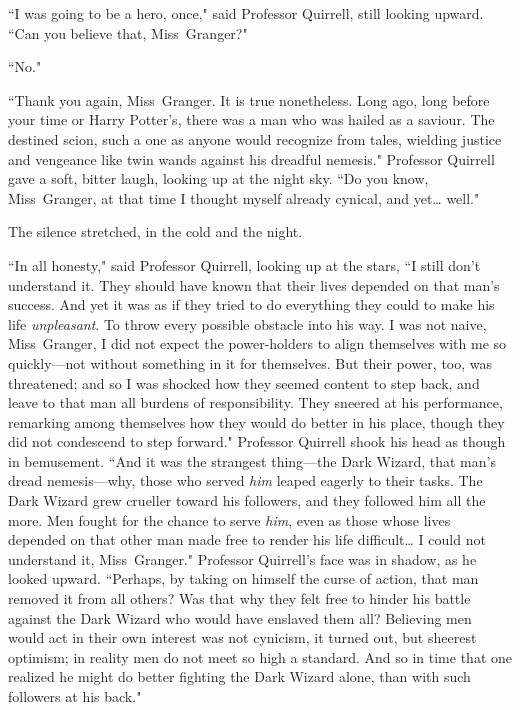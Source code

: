 ``I was going to be a hero, once," said Professor Quirrell, still looking upward. ``Can you believe that, Miss~Granger?"

``No."

``Thank you again, Miss~Granger. It is true nonetheless. Long ago, long before your time or Harry Potter's, there was a man who was hailed as a saviour. The destined scion, such a one as anyone would recognize from tales, wielding justice and vengeance like twin wands against his dreadful nemesis." Professor Quirrell gave a soft, bitter laugh, looking up at the night sky. ``Do you know, Miss~Granger, at that time I thought myself already cynical, and yet{\ldots} well."

The silence stretched, in the cold and the night.

``In all honesty," said Professor Quirrell, looking up at the stars, ``I still don't understand it. They should have known that their lives depended on that man's success. And yet it was as if they tried to do everything they could to make his life \emph{unpleasant}. To throw every possible obstacle into his way. I was not naive, Miss~Granger, I did not expect the power-holders to align themselves with me so quickly—not without something in it for themselves. But their power, too, was threatened; and so I was shocked how they seemed content to step back, and leave to that man all burdens of responsibility. They sneered at his performance, remarking among themselves how they would do better in his place, though they did not condescend to step forward." Professor Quirrell shook his head as though in bemusement. ``And it was the strangest thing—the Dark Wizard, that man's dread nemesis—why, those who served \emph{him} leaped eagerly to their tasks. The Dark Wizard grew crueller toward his followers, and they followed him all the more. Men fought for the chance to serve \emph{him}, even as those whose lives depended on that other man made free to render his life difficult{\ldots} I could not understand it, Miss~Granger." Professor Quirrell's face was in shadow, as he looked upward. ``Perhaps, by taking on himself the curse of action, that man removed it from all others? Was that why they felt free to hinder his battle against the Dark Wizard who would have enslaved them all? Believing men would act in their own interest was not cynicism, it turned out, but sheerest optimism; in reality men do not meet so high a standard. And so in time that one realized he might do better fighting the Dark Wizard alone, than with such followers at his back."


